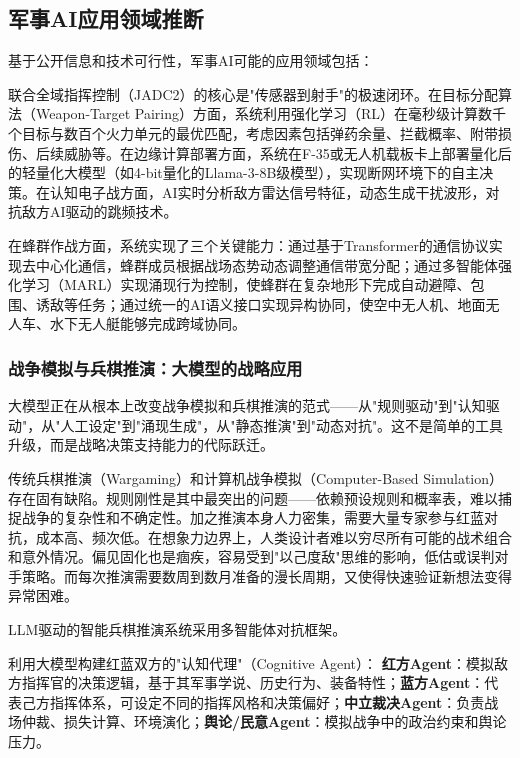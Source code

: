 \subsection{军事AI应用领域推断}

基于公开信息和技术可行性，军事AI可能的应用领域包括：

联合全域指挥控制（JADC2）的核心是"传感器到射手"的极速闭环。在目标分配算法（Weapon-Target Pairing）方面，系统利用强化学习（RL）在毫秒级计算数千个目标与数百个火力单元的最优匹配，考虑因素包括弹药余量、拦截概率、附带损伤、后续威胁等。在边缘计算部署方面，系统在F-35或无人机载板卡上部署量化后的轻量化大模型（如4-bit量化的Llama-3-8B级模型），实现断网环境下的自主决策。在认知电子战方面，AI实时分析敌方雷达信号特征，动态生成干扰波形，对抗敌方AI驱动的跳频技术。

在蜂群作战方面，系统实现了三个关键能力：通过基于Transformer的通信协议实现去中心化通信，蜂群成员根据战场态势动态调整通信带宽分配；通过多智能体强化学习（MARL）实现涌现行为控制，使蜂群在复杂地形下完成自动避障、包围、诱敌等任务；通过统一的AI语义接口实现异构协同，使空中无人机、地面无人车、水下无人艇能够完成跨域协同。

\subsubsection{战争模拟与兵棋推演：大模型的战略应用}

大模型正在从根本上改变战争模拟和兵棋推演的范式——从"规则驱动"到"认知驱动"，从"人工设定"到"涌现生成"，从"静态推演"到"动态对抗"。这不是简单的工具升级，而是战略决策支持能力的代际跃迁。

传统兵棋推演（Wargaming）和计算机战争模拟（Computer-Based Simulation）存在固有缺陷。规则刚性是其中最突出的问题——依赖预设规则和概率表，难以捕捉战争的复杂性和不确定性。加之推演本身人力密集，需要大量专家参与红蓝对抗，成本高、频次低。在想象力边界上，人类设计者难以穷尽所有可能的战术组合和意外情况。偏见固化也是痼疾，容易受到"以己度敌"思维的影响，低估或误判对手策略。而每次推演需要数周到数月准备的漫长周期，又使得快速验证新想法变得异常困难。

LLM驱动的智能兵棋推演系统采用多智能体对抗框架。

利用大模型构建红蓝双方的"认知代理"（Cognitive Agent）：
\textbf{红方Agent}：模拟敌方指挥官的决策逻辑，基于其军事学说、历史行为、装备特性；\quad \textbf{蓝方Agent}：代表己方指挥体系，可设定不同的指挥风格和决策偏好；\quad \textbf{中立裁决Agent}：负责战场仲裁、损失计算、环境演化；\quad \textbf{舆论/民意Agent}：模拟战争中的政治约束和舆论压力。

